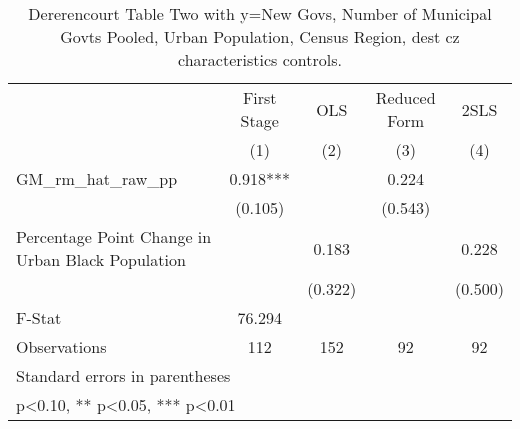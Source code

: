 \begin{table}[htbp]\centering
\def\sym#1{\ifmmode^{#1}\else\(^{#1}\)\fi}
\caption{Dererencourt Table Two with y=New Govs, Number of Municipal Govts  Pooled, Urban Population, Census Region, dest cz characteristics controls.}
\begin{tabular}{l*{4}{c}}
\toprule
                    & First Stage   &         OLS   &Reduced Form   &        2SLS   \\
                    &\multicolumn{1}{c}{(1)}   &\multicolumn{1}{c}{(2)}   &\multicolumn{1}{c}{(3)}   &\multicolumn{1}{c}{(4)}   \\
\midrule
GM\_rm\_hat\_raw\_pp    &       0.918***&               &       0.224   &               \\
                    &     (0.105)   &               &     (0.543)   &               \\
\addlinespace
Percentage Point Change in Urban Black Population&               &       0.183   &               &       0.228   \\
                    &               &     (0.322)   &               &     (0.500)   \\
\midrule
F-Stat              &      76.294   &               &               &               \\
Observations        &         112   &         152   &          92   &          92   \\
\bottomrule
\multicolumn{5}{l}{\footnotesize Standard errors in parentheses}\\
\multicolumn{5}{l}{\footnotesize * p<0.10, ** p<0.05, *** p<0.01}\\
\end{tabular}
\end{table}
